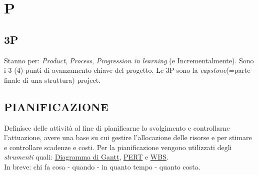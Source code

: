 \newpage
	\section{P} \label{sec:P}
	
		\subsection{3P}		\label{3p}
		Stanno per: \textit{Product}, \textit{Process}, \textit{Progression in learning} (e Incrementalmente). Sono i 3 (4) punti di avanzamento chiave del progetto. Le 3P sono la \textit{capstone}(=parte finale di una struttura) project.
		
		\subsection{PIANIFICAZIONE}  \label{pianificazione}
		Definisce delle attività al fine di pianificarne lo svolgimento e controllarne l’attuazione, avere una base su cui gestire l’allocazione delle risorse e per stimare e controllare scadenze e costi. Per la pianificazione vengono utilizzati degli \textit{strumenti} quali: \underline{\hyperref[gantt]{Diagramma di Gantt}}, \underline{\hyperref[pert]{PERT}} e \underline{\hyperref[wbs]{WBS}}. \\		
		In breve: chi fa cosa - quando - in quanto tempo - quanto costa. 
	
